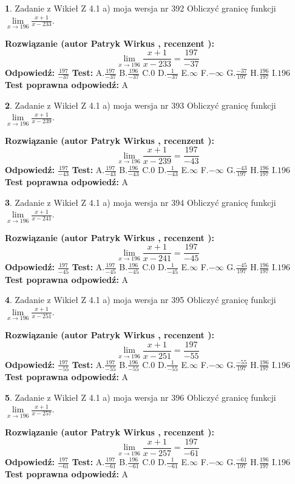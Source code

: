 \documentclass[12pt, a4paper]{article}
\theoremstyle{definition} %
\newtheorem{zad}{}
\newcommand{\zadStart}[1]{\begin{zad}#1\newline}
\newcommand{\zadStop}{\end{zad}}
\newcommand{\rozwStart}[2]{\noindent \textbf{Rozwiązanie (autor #1 , recenzent #2): }\newline}
\newcommand{\rozwStop}{\newline}
\newcommand{\odpStart}{\noindent \textbf{Odpowiedź:}\newline}
\newcommand{\odpStop}{\newline}
\newcommand{\testStart}{\noindent \textbf{Test:}\newline}
\newcommand{\testStop}{\newline}
\newcommand{\kluczStart}{\noindent \textbf{Test poprawna odpowiedź:}\newline}
\newcommand{\kluczStop}{\newline}
\begin{document}
\zadStart{Zadanie z Wikieł Z 4.1 a) moja wersja nr 392}
Obliczyć granicę funkcji $\lim\limits_{x\to196}\frac{x+1}{x-233}$.
\zadStop
\rozwStart{Patryk Wirkus}{}
$$\lim\limits_{x\to196}\frac{x+1}{x-233} = \frac{197}{-37}$$
\rozwStop
\odpStart
$\frac{197}{-37}$
\odpStop
\testStart
A.$\frac{197}{-37}$
B.$\frac{196}{-37}$
C.$0$
D.$\frac{1}{-37}$
E.$\infty$
F.$-\infty$
G.$\frac{-37}{197}$
H.$\frac{196}{197}$
I.$196$
\testStop
\kluczStart
A
\kluczStop



\zadStart{Zadanie z Wikieł Z 4.1 a) moja wersja nr 393}
Obliczyć granicę funkcji $\lim\limits_{x\to196}\frac{x+1}{x-239}$.
\zadStop
\rozwStart{Patryk Wirkus}{}
$$\lim\limits_{x\to196}\frac{x+1}{x-239} = \frac{197}{-43}$$
\rozwStop
\odpStart
$\frac{197}{-43}$
\odpStop
\testStart
A.$\frac{197}{-43}$
B.$\frac{196}{-43}$
C.$0$
D.$\frac{1}{-43}$
E.$\infty$
F.$-\infty$
G.$\frac{-43}{197}$
H.$\frac{196}{197}$
I.$196$
\testStop
\kluczStart
A
\kluczStop



\zadStart{Zadanie z Wikieł Z 4.1 a) moja wersja nr 394}
Obliczyć granicę funkcji $\lim\limits_{x\to196}\frac{x+1}{x-241}$.
\zadStop
\rozwStart{Patryk Wirkus}{}
$$\lim\limits_{x\to196}\frac{x+1}{x-241} = \frac{197}{-45}$$
\rozwStop
\odpStart
$\frac{197}{-45}$
\odpStop
\testStart
A.$\frac{197}{-45}$
B.$\frac{196}{-45}$
C.$0$
D.$\frac{1}{-45}$
E.$\infty$
F.$-\infty$
G.$\frac{-45}{197}$
H.$\frac{196}{197}$
I.$196$
\testStop
\kluczStart
A
\kluczStop



\zadStart{Zadanie z Wikieł Z 4.1 a) moja wersja nr 395}
Obliczyć granicę funkcji $\lim\limits_{x\to196}\frac{x+1}{x-251}$.
\zadStop
\rozwStart{Patryk Wirkus}{}
$$\lim\limits_{x\to196}\frac{x+1}{x-251} = \frac{197}{-55}$$
\rozwStop
\odpStart
$\frac{197}{-55}$
\odpStop
\testStart
A.$\frac{197}{-55}$
B.$\frac{196}{-55}$
C.$0$
D.$\frac{1}{-55}$
E.$\infty$
F.$-\infty$
G.$\frac{-55}{197}$
H.$\frac{196}{197}$
I.$196$
\testStop
\kluczStart
A
\kluczStop



\zadStart{Zadanie z Wikieł Z 4.1 a) moja wersja nr 396}
Obliczyć granicę funkcji $\lim\limits_{x\to196}\frac{x+1}{x-257}$.
\zadStop
\rozwStart{Patryk Wirkus}{}
$$\lim\limits_{x\to196}\frac{x+1}{x-257} = \frac{197}{-61}$$
\rozwStop
\odpStart
$\frac{197}{-61}$
\odpStop
\testStart
A.$\frac{197}{-61}$
B.$\frac{196}{-61}$
C.$0$
D.$\frac{1}{-61}$
E.$\infty$
F.$-\infty$
G.$\frac{-61}{197}$
H.$\frac{196}{197}$
I.$196$
\testStop
\kluczStart
A
\kluczStop
\end{document}
